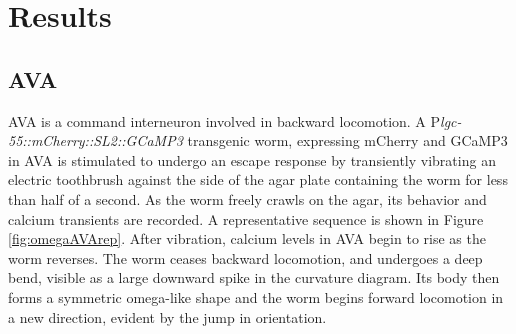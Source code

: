 \section{Results}
\subsection{AVA}
AVA is a command interneuron involved in backward locomotion.  A P\textit{lgc-55::mCherry::SL2::GCaMP3} transgenic worm, expressing mCherry and GCaMP3 in AVA is stimulated to undergo an escape response by transiently vibrating an electric toothbrush against the side of the agar plate containing the worm for less than half of a second.  As the worm freely crawls on the agar, its behavior and calcium transients are recorded. A representative sequence is shown in Figure \ref{fig:omegaAVArep}.  After vibration, calcium levels in AVA begin to rise as the worm reverses. The worm ceases backward locomotion, and undergoes a deep bend, visible as a large downward spike in the curvature diagram. Its body then forms a symmetric omega-like shape and the worm begins forward locomotion in a new direction, evident by the jump in  orientation. 


